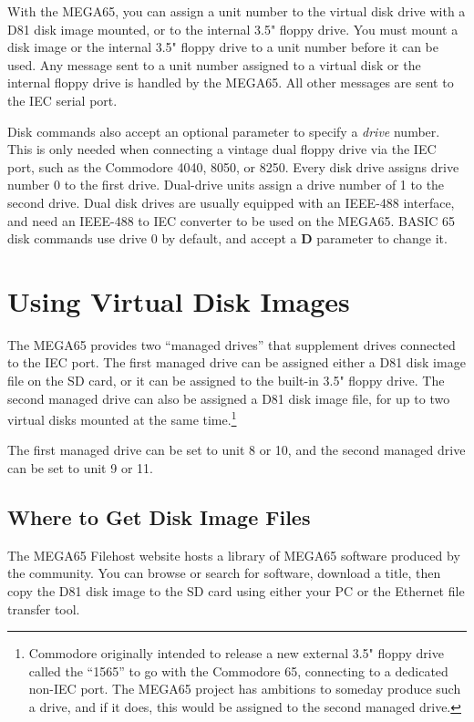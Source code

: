 With the MEGA65, you can assign a unit number to the virtual disk drive with a D81 disk image mounted, or to the internal 3.5" floppy drive. You must mount a disk image or the internal 3.5" floppy drive to a unit number before it can be used. Any message sent to a unit number assigned to a virtual disk or the internal floppy drive is handled by the MEGA65. All other messages are sent to the IEC serial port.

Disk commands also accept an optional parameter to specify a {\it drive} number. This is only needed when connecting a vintage dual floppy drive via the IEC port, such as the Commodore 4040, 8050, or 8250. Every disk drive assigns drive number 0 to the first drive. Dual-drive units assign a drive number of 1 to the second drive. Dual disk drives are usually equipped with an IEEE-488 interface, and need an IEEE-488 to IEC converter to be used on the MEGA65. BASIC 65 disk commands use drive 0 by default, and accept a {\bf D} parameter to change it.


\section{Using Virtual Disk Images}

The MEGA65 provides two ``managed drives'' that supplement drives connected to the IEC port. The first managed drive can be assigned either a D81 disk image file on the SD card, or it can be assigned to the built-in 3.5" floppy drive. The second managed drive can also be assigned a D81 disk image file, for up to two virtual disks mounted at the same time.\footnote{Commodore originally intended to release a new external 3.5" floppy drive called the ``1565'' to go with the Commodore 65, connecting to a dedicated non-IEC port. The MEGA65 project has ambitions to someday produce such a drive, and if it does, this would be assigned to the second managed drive.}

The first managed drive can be set to unit 8 or 10, and the second managed drive can be set to unit 9 or 11.

\subsection{Where to Get Disk Image Files}

The MEGA65 Filehost website hosts a library of MEGA65 software produced by the community. You can browse or search for software, download a title, then copy the D81 disk image to the SD card using either your PC or the Ethernet file transfer tool.

